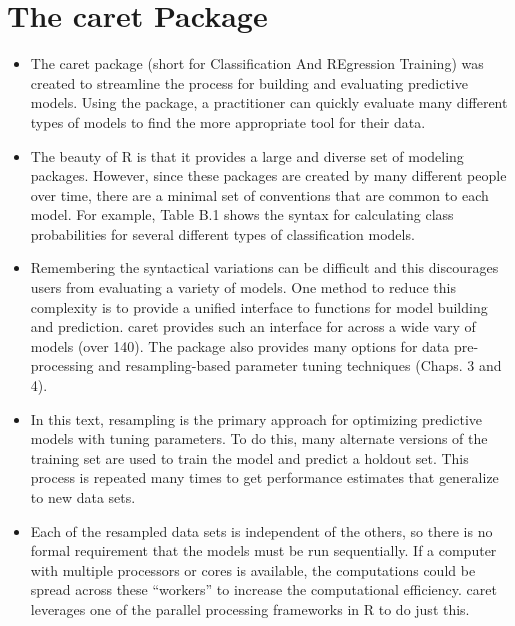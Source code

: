 \documentclass[caret-main.tex]{subfiles}
\begin{document}
\section{The caret Package}
\begin{itemize}
\item The caret package (short for Classification And REgression Training) was
created to streamline the process for building and evaluating predictive models.
Using the package, a practitioner can quickly evaluate many different
types of models to find the more appropriate tool for their data.

\item The beauty of R is that it provides a large and diverse set of modeling packages.
However, since these packages are created by many different people over
time, there are a minimal set of conventions that are common to each model.
For example, Table B.1 shows the syntax for calculating class probabilities for
several different types of classification models. 

\item Remembering the syntactical
variations can be difficult and this discourages users from evaluating a variety
of models. One method to reduce this complexity is to provide a unified interface
to functions for model building and prediction. caret provides such an
interface for across a wide vary of models (over 140). The package also provides
many options for data pre-processing and resampling-based parameter
tuning techniques (Chaps. 3 and 4).

\item In this text, resampling is the primary approach for optimizing predictive
models with tuning parameters. To do this, many alternate versions of the
training set are used to train the model and predict a holdout set. This process
is repeated many times to get performance estimates that generalize to
new data sets. 

\item 
Each of the resampled data sets is independent of the others,
so there is no formal requirement that the models must be run sequentially.
If a computer with multiple processors or cores is available, the computations
could be spread across these “workers” to increase the computational
efficiency. caret leverages one of the parallel processing frameworks in R to do
just this. 


\end{itemize}
\end{document}

